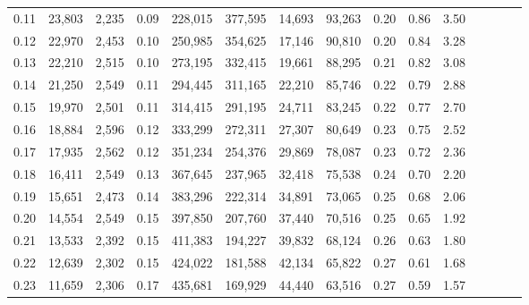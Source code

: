 \begin{tabular}{rrrcrrrrrrrrrrr}
0.11 &  23,803 &  2,235 &                                       0.09 &  228,015 &  377,595 &   14,693 &   93,263 &  0.20 &  0.86 &                         3.50 \\
0.12 &  22,970 &  2,453 &                                       0.10 &  250,985 &  354,625 &   17,146 &   90,810 &  0.20 &  0.84 &                         3.28 \\
0.13 &  22,210 &  2,515 &                                       0.10 &  273,195 &  332,415 &   19,661 &   88,295 &  0.21 &  0.82 &                         3.08 \\
0.14 &  21,250 &  2,549 &                                       0.11 &  294,445 &  311,165 &   22,210 &   85,746 &  0.22 &  0.79 &                         2.88 \\
0.15 &  19,970 &  2,501 &                                       0.11 &  314,415 &  291,195 &   24,711 &   83,245 &  0.22 &  0.77 &                         2.70 \\
0.16 &  18,884 &  2,596 &                                       0.12 &  333,299 &  272,311 &   27,307 &   80,649 &  0.23 &  0.75 &                         2.52 \\
0.17 &  17,935 &  2,562 &                                       0.12 &  351,234 &  254,376 &   29,869 &   78,087 &  0.23 &  0.72 &                         2.36 \\
0.18 &  16,411 &  2,549 &                                       0.13 &  367,645 &  237,965 &   32,418 &   75,538 &  0.24 &  0.70 &                         2.20 \\
0.19 &  15,651 &  2,473 &                                       0.14 &  383,296 &  222,314 &   34,891 &   73,065 &  0.25 &  0.68 &                         2.06 \\
0.20 &  14,554 &  2,549 &                                       0.15 &  397,850 &  207,760 &   37,440 &   70,516 &  0.25 &  0.65 &                         1.92 \\
0.21 &  13,533 &  2,392 &                                       0.15 &  411,383 &  194,227 &   39,832 &   68,124 &  0.26 &  0.63 &                         1.80 \\
0.22 &  12,639 &  2,302 &                                       0.15 &  424,022 &  181,588 &   42,134 &   65,822 &  0.27 &  0.61 &                         1.68 \\
0.23 &  11,659 &  2,306 &                                       0.17 &  435,681 &  169,929 &   44,440 &   63,516 &  0.27 &  0.59 &                         1.57 \\

\end{tabular}
